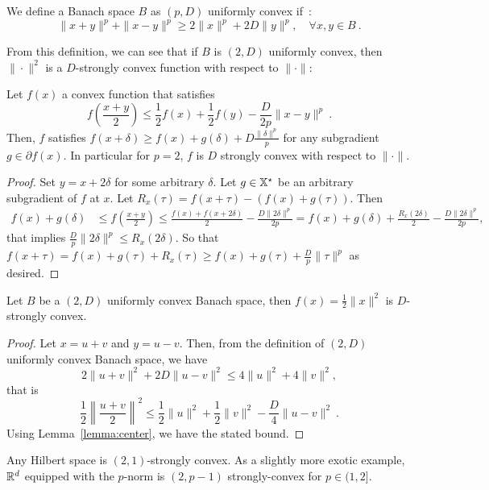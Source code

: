 \documentclass[12pt]{colt2018} %
\begin{document}
\begin{Definition}\label{thm:uniformconvex}
We define a Banach space $B$ as $(p,D)$ uniformly convex if~\citep{Pinelis15}:
\begin{equation}
\|x+y\|^p + \|x-y\|^p \geq 2\|x\|^p+2D\|y\|^p, \quad \forall x,y\in B~.
\end{equation}
\end{Definition}

From this definition, we can see that if $B$ is $(2,D)$ uniformly convex, then $\|\cdot\|^2$ is a $D$-strongly convex function with respect to $\|\cdot\|$:
\begin{lemma}
\label{lemma:center}
Let $f(x)$ a convex function that satisfies
\[
f\left(\frac{x+y}{2}\right) \leq \frac{1}{2} f(x) + \frac{1}{2}f(y) - \frac{D}{2p} \|x-y\|^p~.
\]
Then, $f$ satisfies $f(x+\delta)\ge f(x) + g(\delta) +D\frac{\|\delta\|^p}{p}$ for any subgradient $g\in \partial f(x)$. In particular for $p=2$, $f$ is $D$ strongly convex with respect to $\|\cdot\|$.
\end{lemma}
%
\begin{proof}
Set $y = x+2\delta$ for some arbitrary $\delta$. Let $g\in \mathbb{X}^\star $ be an arbitrary subgradient of $f$ at $x$.
Let $R_x(\tau) = f(x+\tau) - (f(x) + g(\tau))$. Then
\begin{align*}
f(x) + g(\delta) &\le f\left(\frac{x+y}{2}\right)
\le \frac{f(x)+f(x+2\delta)}{2}-\frac{D\|2\delta\|^p}{2p}
=f(x) + g(\delta) + \frac{R_x(2\delta)}{2} - \frac{D\|2\delta\|^p}{2p},
\end{align*}
that implies $\frac{D}{p}\|2\delta\|^p\le R_x(2\delta)$. So that $f(x+\tau)= f(x) + g(\tau) + R_x(\tau) \ge f(x) + g(\tau) + \frac{D}{p}\|\tau\|^p$ as desired.
\end{proof}

\begin{lemma}
Let $B$ be a $(2,D)$ uniformly convex Banach space, then $f(x)=\frac{1}{2}\|x\|^2$ is $D$-strongly convex.
\end{lemma}
%
\begin{proof}
Let $x=u+v$ and $y=u-v$. Then, from the definition of $(2,D)$ uniformly convex Banach space, we have
\[
2\|u+v\|^2 +2 D \|u-v\|^2 \leq 4 \|u\|^2 + 4 \|v\|^2,
\]
that is
\[
\frac{1}{2}\left\|\frac{u+v}{2}\right\|^2 \leq  \frac{1}{2}\|u\|^2 + \frac{1}{2}\|v\|^2 -\frac{D}{4} \|u-v\|^2~.
\]
Using Lemma~\ref{lemma:center}, we have the stated bound.
\end{proof}

Any Hilbert space is $(2,1)$-strongly convex. As a slightly more exotic example, $\mathbb{R}^d$ equipped with the $p$-norm is $(2,p-1)$ strongly-convex for $p\in(1,2]$.
\end{document}

